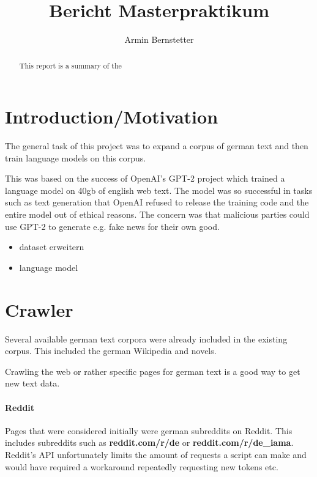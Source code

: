 \documentclass[sigconf,natbib=false]{acmart}
\begin{document}

\title{Bericht Masterpraktikum}

\author{Armin Bernstetter}


\begin{abstract}
This report is a summary of the 
\end{abstract}



\maketitle

\section{Introduction/Motivation}

The general task of this project was to expand a corpus of german text and then train language models on this corpus.

This was based on the success of OpenAI's GPT-2 project which trained a language model on 40gb of english web text. The model was so successful in tasks such as text generation that OpenAI refused to release the training code and the entire model out of ethical reasons. The concern was that malicious parties could use GPT-2 to generate e.g. fake news for their own good.

\begin{itemize}
	\item dataset erweitern
	\item language model
\end{itemize}


\section{Crawler}

Several available german text corpora were already included in the existing corpus. This included the german Wikipedia and novels. 

Crawling the web or rather specific pages for german text is a good way to get new text data.


\paragraph{Reddit}
Pages that were considered initially were german subreddits on Reddit. This includes subreddits such as \textbf{reddit.com/r/de} or \textbf{reddit.com/r/de\_iama}. Reddit's API unfortunately limits the amount of requests a script can make and would have required a workaround repeatedly requesting new tokens etc.
\end{document}
